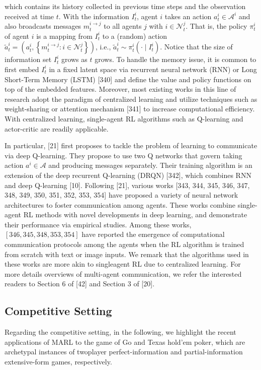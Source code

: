 \documentclass[10pt]{article}
\begin{document}
which contains its history collected in previous time steps and the observation received at time $t$. With the information $I_{t}^{i}$, agent $i$ takes an action $a_{t}^{i} \in \mathcal{A}^{i}$ and also broadcasts messages $m_{t}^{i \rightarrow j}$ to all agents $j$ with $i \in \mathcal{N}_{t}^{j}$. That is, the policy $\pi_{t}^{i}$ of agent $i$ is a mapping from $I_{t}^{i}$ to a (random) action $\widetilde{a}_{t}^{i}=\left(a_{t}^{i},\left\{m_{t}^{i \rightarrow j}: i \in \mathcal{N}_{t}^{j}\right\}\right)$, i.e., $\widetilde{a}_{t}^{i} \sim \pi_{t}^{i}\left(\cdot \mid I_{t}^{i}\right)$. Notice that the size of information set $I_{t}^{i}$ grows as $t$ grows. To handle the memory issue, it is common to first embed $I_{t}^{i}$ in a fixed latent space via recurrent neural network (RNN) or Long Short-Term Memory (LSTM) [340] and define the value and policy functions on top of the embedded features. Moreover, most existing works in this line of research adopt the paradigm of centralized learning and utilize techniques such as weight-sharing or attention mechanism [341] to increase computational efficiency. With centralized learning, single-agent RL algorithms such as Q-learning and actor-critic are readily applicable.

In particular, [21] first proposes to tackle the problem of learning to communicate via deep Q-learning. They propose to use two Q networks that govern taking action $a^{i} \in \mathcal{A}$ and producing messages separately. Their training algorithm is an extension of the deep recurrent Q-learning (DRQN) [342], which combines RNN and deep Q-learning [10]. Following [21], various works [343, 344, 345, 346, 347, 348, 349, 350, 351, 352, 353, 354] have proposed a variety of neural network architectures to foster communication among agents. These works combine single-agent RL methods with novel developments in deep learning, and demonstrate their performance via empirical studies. Among these works, $[346,345,348,353,354]$ have reported the emergence of computational communication protocols among the agents when the RL algorithm is trained from scratch with text or image inputs. We remark that the algorithms used in these works are more akin to singleagent RL due to centralized learning. For more details overviews of multi-agent communication, we refer the interested readers to Section 6 of [42] and Section 3 of [20].

\subsection{Competitive Setting}
Regarding the competitive setting, in the following, we highlight the recent applications of MARL to the game of Go and Texas hold'em poker, which are archetypal instances of twoplayer perfect-information and partial-information extensive-form games, respectively.
\end{document}
